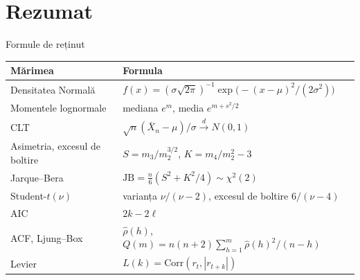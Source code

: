 \section{Rezumat}

\begin{frame}{Formule de reținut}
\itemsize{\small}
\begin{center}
\footnotesize
\begin{tabular}{ll}
\toprule
\textbf{Mărimea} & \textbf{Formula} \\
\midrule
Densitatea Normală & $f(x) = (\sigma\sqrt{2\pi})^{-1}\exp\big(-(x - \mu)^2/(2\sigma^2)\big)$ \\
Momentele lognormale & mediana $e^m$, media $e^{m + s^2/2}$ \\
CLT & $\sqrt{n}(\bar X_n - \mu)/\sigma \xrightarrow{d} N(0,1)$ \\
Asimetria, excesul de boltire & $S = m_3/m_2^{3/2}$, \quad $K = m_4/m_2^2 - 3$ \\
Jarque--Bera & $\text{JB} = \frac{n}{6}(S^2 + K^2/4) \sim \chi^2(2)$ \\
Student-$t(\nu)$ & varianța $\nu/(\nu - 2)$, excesul de boltire $6/(\nu - 4)$ \\
AIC & $2k - 2\ell$ \\
ACF, Ljung--Box & $\hat\rho(h)$, \quad $Q(m) = n(n+2)\sum_{h=1}^m \hat\rho(h)^2/(n - h)$ \\
Levier & $L(k) = \text{Corr}(r_t, |r_{t+k}|)$ \\
\bottomrule
\end{tabular}
\end{center}
\end{frame}

